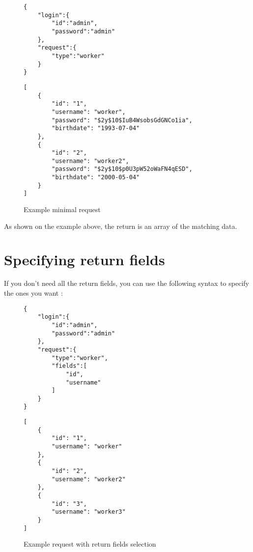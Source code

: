 \documentclass[notitlepage]{report}
\begin{document}
\begin{figure}[h]
\centering
\begin{minipage}{.45\linewidth}
\begin{verbatim}
{
	"login":{	
		"id":"admin",
		"password":"admin"
	},
	"request":{
		"type":"worker"
	}
}
\end{verbatim}
\end{minipage}
\begin{minipage}{.45\linewidth}
\begin{verbatim}
[
    {
        "id": "1",
        "username": "worker",
        "password": "$2y$10$IuB4WsobsGdGNCo1ia",
        "birthdate": "1993-07-04"
    },
    {
        "id": "2",
        "username": "worker2",
        "password": "$2y$10$p0U3pW52oWaFN4qESD",
        "birthdate": "2000-05-04"
    }
]
\end{verbatim}
\end{minipage}
\caption{Example minimal request}
\end{figure}
As shown on the example above, the return is an array of the matching data.

\section{Specifying return fields}
If you don't need all the return fields, you can use the following syntax to specify the ones you want :
\begin{figure}[h]
\centering
\begin{minipage}{.45\linewidth}
\begin{verbatim}
{
	"login":{	
		"id":"admin",
		"password":"admin"
	},
	"request":{
		"type":"worker",
		"fields":[
			"id",
			"username"
		]
	}
}

\end{verbatim}
\end{minipage}
\begin{minipage}{.45\linewidth}
\begin{verbatim}
[
    {
        "id": "1",
        "username": "worker"
    },
    {
        "id": "2",
        "username": "worker2"
    },
    {
        "id": "3",
        "username": "worker3"
    }
]
\end{verbatim}
\end{minipage}
\caption{Example request with return fields selection}
\end{figure}

\newpage
\end{document}
